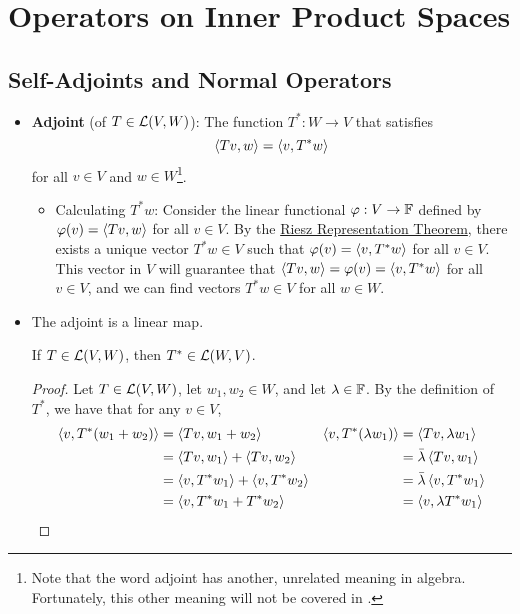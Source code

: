 \documentclass[../main.tex]{subfiles}
\begin{document}
\chapter{Operators on Inner Product Spaces}
\section{Self-Adjoints and Normal Operators}
\begin{itemize}
    \item {}\textbf{Adjoint} (of $T\in\mathcal{L}(V,W)$): The function $T^*:W\to V$ that satisfies
    \begin{equation*}
        \left\langle{Tv},{w}\right\rangle = \left\langle{v},{T^*w}\right\rangle
    \end{equation*}
    for all $v\in V$ and $w\in W$\footnote{Note that the word adjoint has another, unrelated meaning in algebra. Fortunately, this other meaning will not be covered in \textcite{bib:Axler}.}.
    \begin{itemize}
        \item Calculating $T^*w$: Consider the linear functional $\varphi:V\to\mathbb{F}$ defined by $\varphi(v)=\left\langle{Tv},{w}\right\rangle$ for all $v\in V$. By the \hyperref[trm:RieszRepresentationTheorem]{Riesz Representation Theorem}, there exists a unique vector $T^*w\in V$ such that $\varphi(v)=\left\langle{v},{T^*w}\right\rangle$ for all $v\in V$. This vector in $V$ will guarantee that $\left\langle{Tv},{w}\right\rangle=\varphi(v)=\left\langle{v},{T^*w}\right\rangle$ for all $v\in V$, and we can find vectors $T^*w\in V$ for all $w\in W$.
    \end{itemize}
    \item The adjoint is a linear map.
    \begin{theorem}
        If $T\in\mathcal{L}(V,W)$, then $T^*\in\mathcal{L}(W,V)$.
        \begin{proof}
            Let $T\in\mathcal{L}(V,W)$, let $w_1,w_2\in W$, and let $\lambda\in\mathbb{F}$. By the definition of $T^*$, we have that for any $v\in V$,
            \begin{align*}
                \left\langle{v},{T^*(w_1+w_2)}\right\rangle &= \left\langle{Tv},{w_1+w_2}\right\rangle&
                    \left\langle{v},{T^*(\lambda w_1)}\right\rangle &= \left\langle{Tv},{\lambda w_1}\right\rangle\\
                &= \left\langle{Tv},{w_1}\right\rangle+\left\langle{Tv},{w_2}\right\rangle&
                    &= \bar{\lambda}\left\langle{Tv},{w_1}\right\rangle\\
                &= \left\langle{v},{T^*w_1}\right\rangle+\left\langle{v},{T^*w_2}\right\rangle&
                    &= \bar{\lambda}\left\langle{v},{T^*w_1}\right\rangle\\
                &= \left\langle{v},{T^*w_1+T^*w_2}\right\rangle&
                    &= \left\langle{v},{\lambda T^*w_1}\right\rangle
            \end{align*}

\end{proof}
\end{theorem}
\end{itemize}
\end{document}
